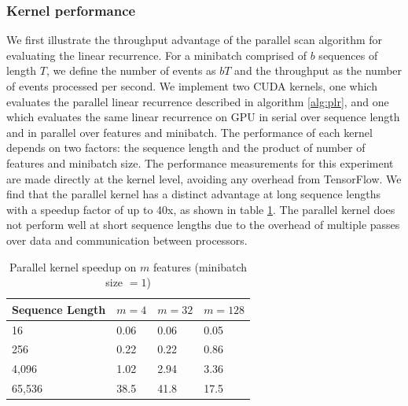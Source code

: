\documentclass{article}
\begin{document}
\subsubsection{Kernel performance}
We first illustrate the throughput advantage of the parallel scan algorithm for
evaluating the linear recurrence. For a minibatch comprised of \(b\) sequences
of length \(T\), we define the number of events as \(bT\) and the throughput as
the number of events processed per second. We implement two CUDA kernels, one which
evaluates the parallel linear recurrence described in algorithm \ref{alg:plr},
and one which evaluates the same linear recurrence on GPU in serial over sequence length
and in parallel over features and minibatch. The performance of each kernel depends on
two factors: the sequence length and the product of number of features and minibatch size.
The performance measurements for this experiment are made directly at the kernel level,
avoiding any overhead from TensorFlow. We find that the parallel kernel has
a distinct advantage at long sequence lengths with a speedup factor of up to 40x,
as shown in table \ref{table:kernel-throughput}.
The parallel kernel does not perform well at short sequence lengths due to the
overhead of multiple passes over data and communication between processors.
\begin{table}[t]
\caption{Parallel kernel speedup on $m$ features (minibatch size $= 1$)}
\begin{center}
\begin{tabular}{@{}llll@{}}
\label{table:kernel-throughput}
Sequence Length & \(m=4\)  & \(m=32\) & \(m=128\) \\ \midrule
16              & 0.06 & 0.06 & 0.05  \\
256             & 0.22 & 0.22 & 0.86  \\
4,096           & 1.02 & 2.94 & 3.36  \\
65,536          & 38.5 & 41.8 & 17.5  \\ \bottomrule
\end{tabular}
\end{center}
\end{table}
\end{document}
